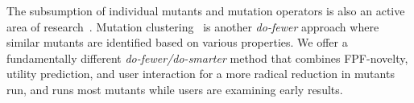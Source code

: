 The subsumption of individual mutants and mutation operators is also an active
area of research~\cite{gopinath2016measuring,shin2016theoretical,lindstrom2015redundant}.
Mutation
clustering~\cite{derezinska2015toward,strug2012machine,hussain2008mutation} is
another \emph{do-fewer} approach where similar mutants are identified based on
various properties.  We offer a fundamentally
different \emph{do-fewer/do-smarter} method that combines FPF-novelty, utility
prediction, and user interaction for a more radical reduction in
mutants run, and runs most mutants while users are examining early results.


%

